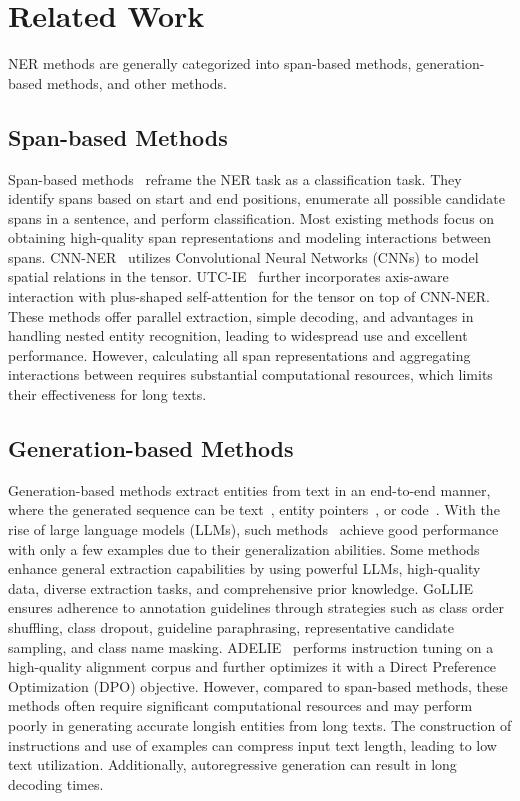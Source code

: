 \section{Related Work}
NER methods are generally categorized into span-based methods, generation-based methods, and other methods.

\subsection{Span-based Methods}

Span-based methods~\cite{li2022unified,yuan-etal-2022-fusing,su2022global,zhu2022boundary} reframe the NER task as a \tokenspan
classification task. 
They identify spans based on start and end positions, enumerate all possible candidate spans in a sentence, and perform classification. 
Most existing methods focus on obtaining high-quality span representations and modeling interactions between spans.
CNN-NER~\cite{yan-etal-2023-embarrassingly} utilizes Convolutional Neural Networks (CNNs) to model spatial relations in the \tokenspan tensor. 
UTC-IE~\cite{yan-etal-2023-utc} further incorporates axis-aware interaction with plus-shaped self-attention for the \tokenspan tensor on top of CNN-NER.
These methods offer parallel extraction, simple decoding, and advantages in handling nested entity recognition, leading to widespread use and excellent performance. 
However, calculating all span representations and aggregating interactions between \tokenspans requires substantial computational resources, which limits their effectiveness for long texts. 

\subsection{Generation-based Methods}

Generation-based methods extract entities from text in an end-to-end manner, 
where the generated sequence can be 
text~\cite{lu2022unified,jiang2024toner}, entity pointers~\cite{yan2021unified}, or code~\cite{sainz2023gollie}. 
With the rise of large language models (LLMs), such methods~\cite{wang2023gpt,xie-etal-2023-empirical,ashok2023promptner} achieve good performance with only a few examples due to their generalization abilities. 
Some methods~\cite{wang2023instructuie,dagdelen2024structured} enhance general extraction capabilities by using powerful LLMs, high-quality data, diverse extraction tasks, and comprehensive prior knowledge. 
GoLLIE~\cite{sainz2023gollie} ensures adherence to annotation guidelines through strategies such as class order shuffling, class dropout, guideline paraphrasing, representative candidate sampling, and class name masking. 
ADELIE~\cite{qi2024adelie} performs instruction tuning
on a high-quality alignment corpus and further optimizes it with a Direct Preference Optimization (DPO) objective. 
However, compared to span-based methods,
these methods often require significant computational resources and may perform poorly in generating accurate longish entities from long texts.
The construction of instructions and use of examples can compress input text length, leading to low text utilization. Additionally, autoregressive generation can result in long decoding times. 


